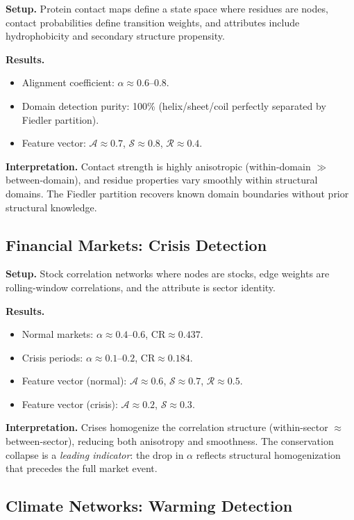\documentclass[12pt,letterpaper]{article}
\newcommand{\CR}{\mathrm{CR}}
\newcommand{\cA}{\mathcal{A}}
\newcommand{\cS}{\mathcal{S}}
\newcommand{\cR}{\mathcal{R}}
\begin{document}
\textbf{Setup.} Protein contact maps define a state space where residues are nodes, contact probabilities define transition weights, and attributes include hydrophobicity and secondary structure propensity.

\textbf{Results.}
\begin{itemize}
  \item Alignment coefficient: $\alpha \approx 0.6$--$0.8$.
  \item Domain detection purity: 100\% (helix/sheet/coil perfectly separated by Fiedler partition).
  \item Feature vector: $\cA \approx 0.7$, $\cS \approx 0.8$, $\cR \approx 0.4$.
\end{itemize}

\textbf{Interpretation.} Contact strength is highly anisotropic (within-domain $\gg$ between-domain), and residue properties vary smoothly within structural domains. The Fiedler partition recovers known domain boundaries without prior structural knowledge.

\subsection{Financial Markets: Crisis Detection}

\textbf{Setup.} Stock correlation networks where nodes are stocks, edge weights are rolling-window correlations, and the attribute is sector identity.

\textbf{Results.}
\begin{itemize}
  \item Normal markets: $\alpha \approx 0.4$--$0.6$, $\CR \approx 0.437$.
  \item Crisis periods: $\alpha \approx 0.1$--$0.2$, $\CR \approx 0.184$.
  \item Feature vector (normal): $\cA \approx 0.6$, $\cS \approx 0.7$, $\cR \approx 0.5$.
  \item Feature vector (crisis): $\cA \approx 0.2$, $\cS \approx 0.3$.
\end{itemize}

\textbf{Interpretation.} Crises homogenize the correlation structure (within-sector $\approx$ between-sector), reducing both anisotropy and smoothness. The conservation collapse is a \emph{leading indicator}: the drop in $\alpha$ reflects structural homogenization that precedes the full market event.

\subsection{Climate Networks: Warming Detection}
\end{document}
